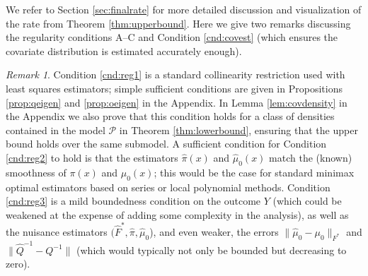 \documentclass[11pt,twoside]{article}
\theoremstyle{definition}
\theoremstyle{remark}
\newtheorem{remark}{Remark}
\begin{document}
\bigskip

We refer to Section \ref{sec:finalrate} for more detailed discussion and visualization of the rate from Theorem \ref{thm:upperbound}. Here we give two remarks discussing the regularity conditions A--C and Condition \ref{cnd:covest} (which ensures the covariate distribution is estimated accurately enough).  \\

\begin{remark}
Condition \ref{cnd:reg1} is a standard collinearity restriction used with least squares estimators; simple sufficient conditions are given in Propositions \ref{prop:qeigen} and \ref{prop:oeigen} in the Appendix. In Lemma \ref{lem:covdensity} in the Appendix we also prove that this condition holds for a class of densities contained in the model $\mathcal{P}$ in Theorem \ref{thm:lowerbound}, ensuring that the upper bound  holds over the same submodel. A sufficient condition for Condition \ref{cnd:reg2} to hold is that the estimators $\widehat\pi(x)$ and $\widehat\mu_0(x)$ match the (known) smoothness of $\pi(x)$ and $\mu_0(x)$; this would be the case for standard minimax optimal estimators based on series or local polynomial methods. Condition \ref{cnd:reg3} is a mild boundedness condition on the outcome $Y$ (which could be weakened at the expense of adding some complexity in the analysis), as well as the nuisance estimators $(\widehat{F}^*, \widehat\pi,\widehat\mu_0$), and even weaker, the errors $\| \widehat\mu_0 - \mu_0 \|_{F^*}$ and $ \| \widehat{Q}^{-1} - {Q}^{-1} \|$ (which would typically not only be bounded but decreasing to zero). \\
\end{remark}
\end{document}
